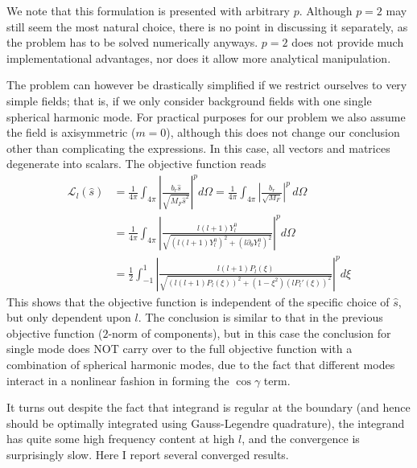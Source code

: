 \documentclass[a4paper, 11pt]{article}
\begin{document}
We note that this formulation is presented with arbitrary $p$. Although $p=2$ may still seem the most natural choice, there is no point in discussing it separately, as the problem has to be solved numerically anyways. $p=2$ does not provide much implementational advantages, nor does it allow more analytical manipulation.

The problem can however be drastically simplified if we restrict ourselves to very simple fields; that is, if we only consider background fields with one single spherical harmonic mode. For practical purposes for our problem we also assume the field is axisymmetric ($m=0$), although this does not change our conclusion other than complicating the expressions. In this case, all vectors and matrices degenerate into scalars. The objective function reads
\begin{equation}
\begin{aligned}
    \mathcal{L}_l(\hat{s}) &= \frac{1}{4\pi} \int_{4\pi} \left|\frac{b_r \hat{s}}{\sqrt{M_F \hat{s}^2}}\right|^p d\Omega = \frac{1}{4\pi} \int_{4\pi} \left|\frac{b_r}{\sqrt{M_F}}\right|^p \, d\Omega \\
    &= \frac{1}{4\pi} \int_{4\pi} \left|\frac{l(l+1) Y_l^0}{\sqrt{(l(l+1)Y_l^0)^2 + (l\partial_\theta Y_l^0)^2}}\right|^p d\Omega \\ 
    &= \frac{1}{2} \int_{-1}^{1} \left|\frac{l(l+1) P_l(\xi)}{\sqrt{(l(l+1)P_l(\xi))^2 + (1 - \xi^2)(l P_l'(\xi))^2}}\right|^p d\xi
\end{aligned}
\end{equation}
This shows that the objective function is independent of the specific choice of $\hat{s}$, but only dependent upon $l$. The conclusion is similar to that in the previous objective function ($2$-norm of components), but in this case the conclusion for single mode does NOT carry over to the full objective function with a combination of spherical harmonic modes, due to the fact that different modes interact in a nonlinear fashion in forming the $\cos\gamma$ term. 

It turns out despite the fact that integrand is regular at the boundary (and hence should be optimally integrated using Gauss-Legendre quadrature), the integrand has quite some high frequency content at high $l$, and the convergence is surprisingly slow. Here I report several converged results.
\end{document}
